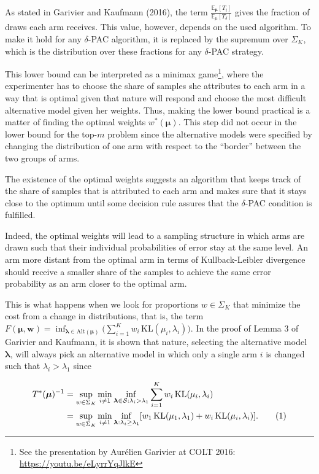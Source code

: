 \documentclass[11pt,]{article}
\let\rmarkdownfootnote\footnote%
\def\footnote{\protect\rmarkdownfootnote}
\newcommand{\KL}{\,\text{KL}}
\newcommand*{\Alignyesnumber}{\refstepcounter{equation}\tag{\theequation}}%
\begin{document}
As stated in Garivier and Kaufmann (2016), the term
\(\frac{\mathbb{E}_{\bm{\mu}}[T_i]}{\mathbb{E}_{\mu}[T_{\delta}]}\)
gives the fraction of draws each arm receives. This value, however,
depends on the used algorithm. To make it hold for any \(\delta\)-PAC
algorithm, it is replaced by the supremum over \(\Sigma_K\), which is
the distribution over these fractions for any \(\delta\)-PAC strategy.

This lower bound can be interpreted as a minimax game\footnote{See the
  presentation by Aurélien Garivier at COLT 2016:
  \url{https://youtu.be/eLyrrYqJlkE}}, where the experimenter has to
choose the share of samples she attributes to each arm in a way that is
optimal given that nature will respond and choose the most difficult
alternative model given her weights. Thus, making the lower bound
practical is a matter of finding the optimal weights \(w^*(\bm{\mu})\).
This step did not occur in the lower bound for the top-\(m\) problem
since the alternative models were specified by changing the distribution
of one arm with respect to the ``border'' between the two groups of
arms.

The existence of the optimal weights suggests an algorithm that keeps
track of the share of samples that is attributed to each arm and makes
sure that it stays close to the optimum until some decision rule assures
that the \(\delta\)-PAC condition is fulfilled.

Indeed, the optimal weights will lead to a sampling structure in which
arms are drawn such that their individual probabilities of error stay at
the same level. An arm more distant from the optimal arm in terms of
Kullback-Leibler divergence should receive a smaller share of the
samples to achieve the same error probability as an arm closer to the
optimal arm.

This is what happens when we look for proportions \(w \in \Sigma_K\)
that minimize the cost from a change in distributions, that is, the term
\(F(\bm{\mu}, \bm{w}) = \inf_{\bm{\lambda} \in \text{Alt}(\bm{\mu})} \Big(\sum_{i= 1}^K w_i \KL(\mu_i, \lambda_i)\Big)\).
In the proof of Lemma 3 of Garivier and Kaufmann, it is shown that
nature, selecting the alternative model \(\bm{\lambda}\), will always
pick an alternative model in which only a single arm \(i\) is changed
such that \(\lambda_i > \lambda_1\) since

\begin{align*}
T^*(\bm{\mu})^{-1} & = \sup_{w \in \Sigma_K} \min_{i \neq 1} \inf_{\bm{\lambda} \in \mathcal{S}: \lambda_i > \lambda_1} \sum_{i=1}^K w_i \KL(\mu_i, \lambda_i)  \\
& = \sup_{w \in \Sigma_K} \min_{i \neq 1} \inf_{\bm{\lambda}: \lambda_i \geq \lambda_1} [w_1 \KL(\mu_1, \lambda_1)+w_i \KL(\mu_i, \lambda_i)]. \Alignyesnumber\label{eqn:ComplexityTrackStopStrategy}
\end{align*}
\end{document}
